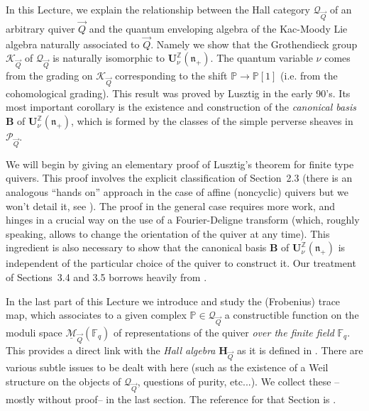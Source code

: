 \documentclass[a4paper,10pt]{amsart}
\def\Z{\mathbb{Z}}
\def\U{\mathbf{U}}
\def\n{\mathfrak{n}}
\def\v{\nu}
\def\QQ{\mathcal{Q}_{\vec{Q}}}
\numberwithin{equation}{section}
\begin{document}
\vspace{.2in}

In this Lecture, we explain the relationship between the Hall category $\QQ$ of an arbitrary quiver $\vec{Q}$ and the quantum enveloping algebra of the Kac-Moody Lie algebra naturally associated to $\vec{Q}$. Namely we show that the Grothendieck group $\mathcal{K}_{\vec{Q}}$ of $\QQ$ is naturally isomorphic to $\U^{\Z}_{\v}(\mathfrak{n}_+)$. The quantum variable $\v$ comes from the grading on $\mathcal{K}_{\vec{Q}}$ corresponding to the shift $\mathbb{P} \to \mathbb{P}[1]$ (i.e. from the cohomological grading). This result was proved by Lusztig in the early 90's. Its most important corollary is the existence and construction of the \textit{canonical basis} $\mathbf{B}$ of $\mathbf{U}^{\Z}_\v(\mathfrak{n}_+)$, which is formed by the classes of the simple perverse sheaves in $\mathcal{P}_{\vec{Q}}$.

\vspace{.1in}

We will begin by giving an elementary proof of Lusztig's theorem for finite type quivers. This proof involves the explicit classification of Section~2.3 (there is an analogous ``hands on'' approach in the case of affine (noncyclic) quivers but we won't detail it, see \cite{LZ}). The proof in the general case requires more work, and hinges in a crucial way on the use of a Fourier-Deligne transform (which, roughly speaking, allows to change the orientation
of the quiver at any time). This ingredient is also necessary to show that the canonical basis $\mathbf{B}$ of $\U^{\Z}_\v(\n_+)$ is independent of the particular choice of the quiver to construct it. Our treatment of Sections~3.4 and 3.5 borrows heavily from \cite{Lusbook}.

\vspace{.1in}

In the last part of this Lecture we introduce and study the (Frobenius)  trace map, which associates to a given complex $\mathbb{P} \in \QQ$ a constructible function on the moduli space $\underline{\mathcal{M}}_{\vec{Q}}(\mathbb{F}_q)$ of representations of the quiver \textit{over the finite field} $\mathbb{F}_q$. This provides a direct link with the \textit{Hall algebra} $\mathbf{H}_{\vec{Q}}$ as it is defined in \cite{Trieste}. There are various subtle issues to be dealt with here (such as the existence of a Weil structure on the objects of $\QQ$, questions of purity, etc...). We collect these --mostly without proof-- in the last section. The reference for that Section is \cite{LusHall}.
\end{document}
